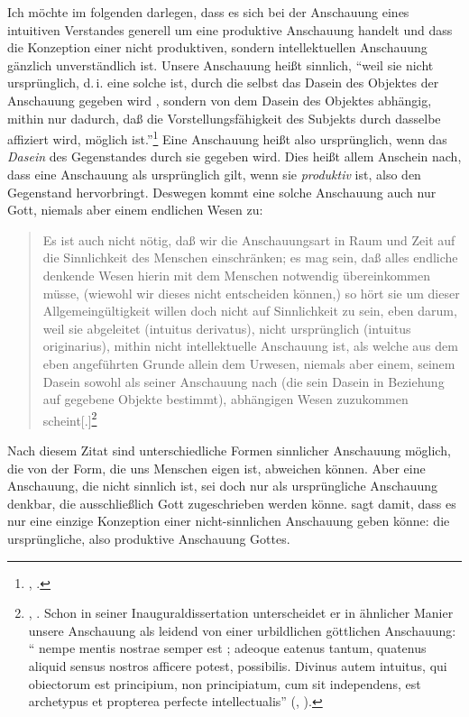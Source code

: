 Ich möchte im folgenden darlegen, dass es sich bei der Anschauung eines
intuitiven Verstandes generell um eine produktive Anschauung handelt und dass die
Konzeption einer nicht produktiven, sondern 
intellektuellen Anschauung gänzlich unverständlich ist. Unsere Anschauung heißt
sinnlich, \enquote{weil sie nicht ursprünglich, d.\,i. eine solche ist, durch
die selbst das Dasein des Objektes der Anschauung gegeben wird {\punkt}, sondern
von dem Dasein des Objektes abhängig, mithin nur dadurch, daß die
Vorstellungsfähigkeit des Subjekts durch dasselbe affiziert wird, möglich
ist.}\footnote{\cite[][B 72]{Kant:KritikderreinenVernunft2003}, \cite[][III:
72.24--28]{Kant:GesammelteWerke1900ff.}.} Eine Anschauung heißt also
ursprünglich, wenn das \emph{Dasein} des Gegenstandes durch sie gegeben wird.
Dies heißt allem Anschein nach, dass eine Anschauung als ursprünglich gilt, wenn
sie \emph{produktiv} ist, also den Gegenstand hervorbringt. Deswegen kommt eine
solche Anschauung auch nur Gott, niemals aber einem endlichen Wesen zu:
\begin{quote}
Es ist auch nicht nötig, daß wir die Anschauungsart in Raum und Zeit auf die
Sinnlichkeit des Menschen einschränken; es mag sein, daß alles endliche denkende
Wesen hierin mit dem Menschen notwendig übereinkommen müsse, (wiewohl wir dieses
nicht entscheiden können,) so hört sie um dieser Allgemeingültigkeit willen doch
nicht auf Sinnlichkeit zu sein, eben darum, weil sie abgeleitet (intuitus
derivatus), nicht ursprünglich (intuitus originarius), mithin nicht
intellektuelle Anschauung ist, als welche aus dem eben angeführten Grunde allein
dem Urwesen, niemals aber einem, seinem Dasein sowohl als seiner Anschauung nach
(die sein Dasein in Beziehung auf gegebene Objekte bestimmt), abhängigen Wesen
zuzukommen scheint[.]\footnote{\cite[][B 72]{Kant:KritikderreinenVernunft2003},
\cite[][III: 72.29--73.2]{Kant:GesammelteWerke1900ff.}. Schon in seiner
Inauguraldissertation unterscheidet er in ähnlicher Manier unsere Anschauung als
leidend von einer urbildlichen göttlichen Anschauung: \enquote{
nempe mentis nostrae semper est ; adeoque eatenus tantum, quatenus
aliquid sensus nostros afficere potest, possibilis. Divinus autem intuitus, qui
obiectorum est principium, non principiatum, cum sit independens, est archetypus
et propterea perfecte intellectualis}
\mkbibparens{\cite[][\S~10]{Kant:Demundisensibilisatqueintelligibilisformaetprincipiis1968},
\cite[][II: 396.31--397.4]{Kant:GesammelteWerke1900ff.}}.}
\end{quote}
Nach diesem Zitat sind unterschiedliche Formen sinnlicher Anschauung möglich,
die von der Form, die uns Menschen eigen ist, abweichen können. Aber eine
Anschauung, die nicht sinnlich ist, sei doch nur als ursprüngliche Anschauung
denkbar, die ausschließlich Gott zugeschrieben werden könne.
 sagt damit, dass es nur eine einzige Konzeption einer
nicht-sinnlichen Anschauung geben könne: die ursprüngliche, also produktive
Anschauung Gottes.


